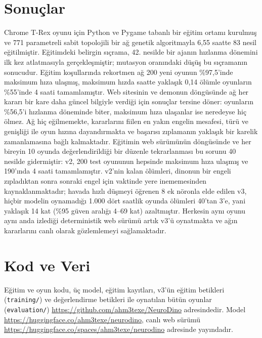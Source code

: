 \documentclass[11pt,a4paper]{article}
\begin{document}
\section{Sonuçlar}

Chrome T-Rex oyunu için Python ve Pygame tabanlı bir eğitim ortamı kurulmuş ve 771 parametreli sabit topolojili bir ağ genetik algoritmayla 6,55 saatte 83 nesil eğitilmiştir. Eğitimdeki belirgin sıçrama, 42. nesilde bir ajanın hızlanma dönemini ilk kez atlatmasıyla gerçekleşmiştir; mutasyon oranındaki düşüş bu sıçramanın sonucudur. Eğitim koşullarında rekortmen ağ 200 yeni oyunun \%97,5'inde maksimum hıza ulaşmış, maksimum hızda saatte yaklaşık 0,14 ölümle oyunların \%55'inde 4 saati tamamlamıştır. Web sitesinin ve demonun döngüsünde ağ her kararı bir kare daha güncel bilgiyle verdiği için sonuçlar tersine döner: oyunların \%56,5'i hızlanma döneminde biter, maksimum hıza ulaşanlar ise neredeyse hiç ölmez. Ağ hiç eğilmemekte, kararlarını fiilen en yakın engelin mesafesi, türü ve genişliği ile oyun hızına dayandırmakta ve başarısı zıplamanın yaklaşık bir karelik zamanlamasına bağlı kalmaktadır. Eğitimin web sürümünün döngüsünde ve her bireyin 10 oyunda değerlendirildiği bir düzenle tekrarlanması bu sorunu 40 nesilde gidermiştir: v2, 200 test oyununun hepsinde maksimum hıza ulaşmış ve 190'ında 4 saati tamamlamıştır. v2'nin kalan ölümleri, dinonun bir engeli zıpladıktan sonra sonraki engel için vaktinde yere inememesinden kaynaklanmaktadır; havada hızlı düşmeyi öğrenen 8 ek nöronla elde edilen v3, hiçbir modelin oynamadığı 1.000 dört saatlik oyunda ölümleri 40'tan 3'e, yani yaklaşık 14 kat (\%95 güven aralığı 4--69 kat) azaltmıştır. Herkesin aynı oyunu aynı anda izlediği deterministik web sürümü artık v3'ü oynatmakta ve ağın kararlarını canlı olarak gözlemlemeyi sağlamaktadır.

\section*{Kod ve Veri}

Eğitim ve oyun kodu, üç model, eğitim kayıtları, v3'ün eğitim betikleri (\texttt{training/}) ve değerlendirme betikleri ile oynatılan bütün oyunlar (\texttt{evaluation/}) \url{https://github.com/ahm3texe/NeuroDino} adresindedir. Model \url{https://huggingface.co/ahm3texe/neurodino}, canlı web sürümü \url{https://huggingface.co/spaces/ahm3texe/neurodino} adresinde yayındadır.
\end{document}
